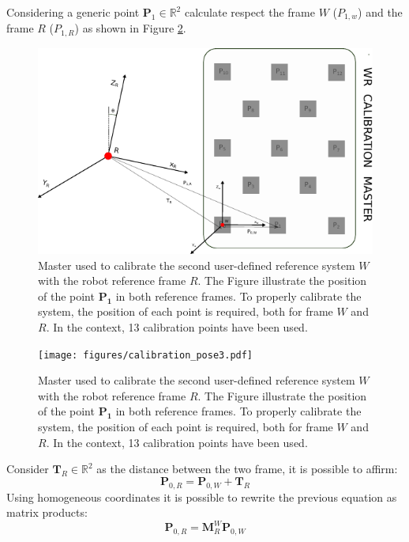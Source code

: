 \documentclass[letterpaper, 10 pt, conference]{ieeeconf}  %
\begin{document}
Considering a generic point $\mathbf{P}_1\in\mathbb{R}^2$ calculate respect the frame $W$ ($P_{1,w}$) and the frame $R$ ($P_{1,R}$) as shown in Figure \ref{fig:master_robot}.
\begin{figure}[]
	\centering
	\includegraphics[width=1\columnwidth]{figures/calibration_master2.pdf}
	\caption{Master used to calibrate the second user-defined reference system $W$ with the robot reference frame $R$. The Figure illustrate the position of the point $\mathbf{P_1}$ in both reference frames. To properly calibrate the system, the position of each point is required, both for frame $W$ and $R$. In the context, 13 calibration points have been used.}
	\label{fig:master_robot}
\end{figure}
\begin{figure}[]
	\centering
	\texttt{[image: figures/calibration\_pose3.pdf]}
	\caption{Master used to calibrate the second user-defined reference system $W$ with the robot reference frame $R$. The Figure illustrate the position of the point $\mathbf{P_1}$ in both reference frames. To properly calibrate the system, the position of each point is required, both for frame $W$ and $R$. In the context, 13 calibration points have been used.}
	\label{fig:master_robot}
\end{figure}
Consider $\mathbf{T}_R\in\mathbb{R}^2$ as the distance between the two frame, it is possible to affirm:
\begin{equation}
\mathbf{P}_{0,R} = \mathbf{P}_{0,W} + \mathbf{T}_R
\end{equation}
Using homogeneous coordinates it is possible to rewrite the previous equation as matrix products:
\begin{equation}\label{eq:matrix_M}
\mathbf{P}_{0,R} = \mathbf{M}^W_{R}\mathbf{P}_{0,W}
\end{equation}
\end{document}
